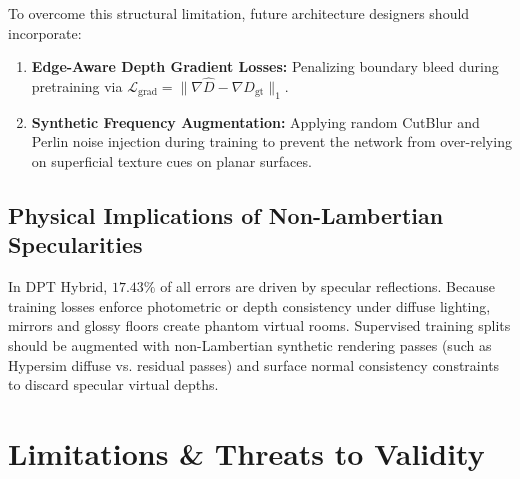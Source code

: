 \documentclass[11pt,a4paper]{article}
\begin{document}
To overcome this structural limitation, future architecture designers should incorporate:
\begin{enumerate}
    \item \textbf{Edge-Aware Depth Gradient Losses:} Penalizing boundary bleed during pretraining via $\mathcal{L}_{\mathrm{grad}} = \|\nabla \hat{D} - \nabla D_{\mathrm{gt}}\|_1$.
    \item \textbf{Synthetic Frequency Augmentation:} Applying random CutBlur and Perlin noise injection during training to prevent the network from over-relying on superficial texture cues on planar surfaces.
\end{enumerate}

\subsection{Physical Implications of Non-Lambertian Specularities}
In DPT Hybrid, $17.43\%$ of all errors are driven by specular reflections. Because training losses enforce photometric or depth consistency under diffuse lighting, mirrors and glossy floors create phantom virtual rooms. Supervised training splits should be augmented with non-Lambertian synthetic rendering passes (such as Hypersim diffuse vs. residual passes) and surface normal consistency constraints to discard specular virtual depths.

\section{Limitations \& Threats to Validity}
\label{sec:limitations}
\end{document}
